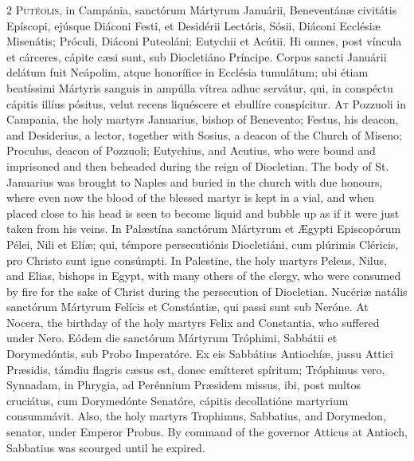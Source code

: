 \begin{paracol}{2}
\lettrine[lines=2]{P}{utéolis,} in Campánia, sanctórum Mártyrum Januárii, Beneventánæ civitátis Epíscopi, ejúsque Diáconi 
 Festi, et Desidérii Lectóris, Sósii, Diáconi Ecclésiæ Misenátis; Próculi, 
 Diáconi Puteoláni; Eutychii et Acútii. Hi omnes, post víncula et cárceres, cápite cæsi sunt, sub Diocletiáno Príncipe. Corpus sancti 
 Januárii delátum fuit Neápolim, atque honorífice in Ecclésia tumulátum; ubi 
 étiam beatíssimi Mártyris sanguis in ampúlla vítrea adhuc servátur, qui, in 
 conspéctu cápitis illíus pósitus, velut recens liquéscere et ebullíre 
 conspícitur.
\switchcolumn
{}
\lettrine[lines=2]{A}{t} Pozzuoli in Campania, the holy 
 martyrs Januarius, bishop of Benevento; Festus, his deacon, and Desiderius, 
 a lector, together with Sosius, a deacon of the Church of Miseno; Proculus, 
 deacon of Pozzuoli; Eutychius, and Acutius, who were bound and imprisoned 
 and then beheaded during the reign of Diocletian. The body of St. Januarius 
 was brought to Naples and buried in the church with due honours, where even 
 now the blood of the blessed martyr is kept in a vial, and when placed close 
 to his head is seen to become liquid and bubble up as if it were just taken 
 from his veins.
\switchcolumn*
{}
In Palæstína sanctórum 
 Mártyrum et Ægypti Episcopórum Pélei, Nili et Elíæ; qui, témpore 
 persecutiónis Diocletiáni, cum plúrimis Cléricis, pro Christo sunt igne 
 consúmpti.
\switchcolumn
{}
In Palestine, the holy martyrs 
 Peleus, Nilus, and Elias, bishops in Egypt, with many others of the clergy, 
 who were consumed by fire for the sake of Christ during the persecution of 
 Diocletian.
\switchcolumn*
{}
Nucériæ natális 
 sanctórum Mártyrum Felícis et Constántiæ, qui passi sunt sub Neróne.
\switchcolumn
{}
At Nocera, the birthday of the holy 
 martyrs Felix and Constantia, who suffered under Nero.
\switchcolumn*
{}
Eódem die sanctórum 
 Mártyrum Tróphimi, Sabbátii et Dorymedóntis, sub Probo Imperatóre. Ex 
 eis Sabbátius Antiochíæ, jussu Attici Præsidis, támdiu flagris cæsus est, 
 donec emítteret spíritum; Tróphimus vero, Synnadam, in Phrygia, ad Perénnium 
 Præsidem missus, ibi, post multos cruciátus, cum Dorymedónte Senatóre, 
 cápitis decollatióne martyrium consummávit.
\switchcolumn
{}
Also, the holy martyrs Trophimus, 
 Sabbatius, and Dorymedon, senator, under Emperor Probus. By command of 
 the governor Atticus at Antioch, Sabbatius was scourged until he expired. 

\end{paracol}

